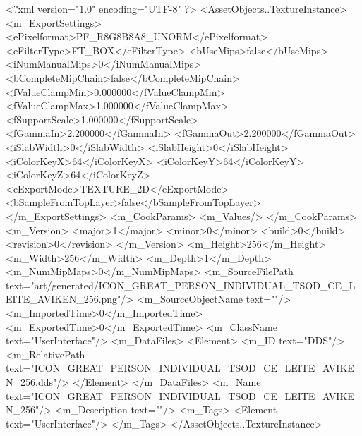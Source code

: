 <?xml version="1.0" encoding="UTF-8" ?>
<AssetObjects..TextureInstance>
	<m_ExportSettings>
		<ePixelformat>PF_R8G8B8A8_UNORM</ePixelformat>
		<eFilterType>FT_BOX</eFilterType>
		<bUseMips>false</bUseMips>
		<iNumManualMips>0</iNumManualMips>
		<bCompleteMipChain>false</bCompleteMipChain>
		<fValueClampMin>0.000000</fValueClampMin>
		<fValueClampMax>1.000000</fValueClampMax>
		<fSupportScale>1.000000</fSupportScale>
		<fGammaIn>2.200000</fGammaIn>
		<fGammaOut>2.200000</fGammaOut>
		<iSlabWidth>0</iSlabWidth>
		<iSlabHeight>0</iSlabHeight>
		<iColorKeyX>64</iColorKeyX>
		<iColorKeyY>64</iColorKeyY>
		<iColorKeyZ>64</iColorKeyZ>
		<eExportMode>TEXTURE_2D</eExportMode>
		<bSampleFromTopLayer>false</bSampleFromTopLayer>
	</m_ExportSettings>
	<m_CookParams>
		<m_Values/>
	</m_CookParams>
	<m_Version>
		<major>1</major>
		<minor>0</minor>
		<build>0</build>
		<revision>0</revision>
	</m_Version>
	<m_Height>256</m_Height>
	<m_Width>256</m_Width>
	<m_Depth>1</m_Depth>
	<m_NumMipMaps>0</m_NumMipMaps>
	<m_SourceFilePath text="art/generated/ICON_GREAT_PERSON_INDIVIDUAL_TSOD_CE_LEITE_AVIKEN_256.png"/>
	<m_SourceObjectName text=""/>
	<m_ImportedTime>0</m_ImportedTime>
	<m_ExportedTime>0</m_ExportedTime>
	<m_ClassName text="UserInterface"/>
	<m_DataFiles>
		<Element>
			<m_ID text="DDS"/>
			<m_RelativePath text="ICON_GREAT_PERSON_INDIVIDUAL_TSOD_CE_LEITE_AVIKEN_256.dds"/>
		</Element>
	</m_DataFiles>
	<m_Name text="ICON_GREAT_PERSON_INDIVIDUAL_TSOD_CE_LEITE_AVIKEN_256"/>
	<m_Description text=""/>
	<m_Tags>
		<Element text="UserInterface"/>
	</m_Tags>
</AssetObjects..TextureInstance>
